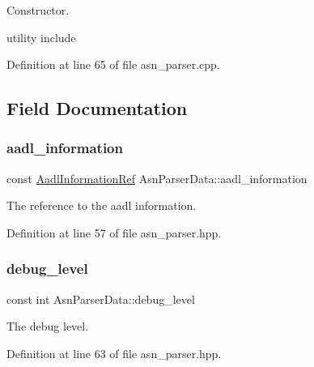 Constructor. 

utility include 

Definition at line 65 of file asn\+\_\+parser.\+cpp.



\subsection{Field Documentation}
\mbox{\label{structAsnParserData_ae22aa0389c4544b1b987c0597cb72930}} 
\subsubsection{\texorpdfstring{aadl\+\_\+information}{aadl\_information}}
{\footnotesize\ttfamily const \hyperlink{aadl__information_8hpp_ad2aa3a9df7fbf64760e8fc1a5e7b9b3e}{Aadl\+Information\+Ref} Asn\+Parser\+Data\+::aadl\+\_\+information}



The reference to the aadl information. 



Definition at line 57 of file asn\+\_\+parser.\+hpp.

\mbox{\label{structAsnParserData_af78b30a1f7336e3d48b160957e695f93}} 
\subsubsection{\texorpdfstring{debug\+\_\+level}{debug\_level}}
{\footnotesize\ttfamily const int Asn\+Parser\+Data\+::debug\+\_\+level}



The debug level. 



Definition at line 63 of file asn\+\_\+parser.\+hpp.

\mbox{\label{structAsnParserData_ac25a39d9cca4361a71ed73e4d1ba6955}} 
